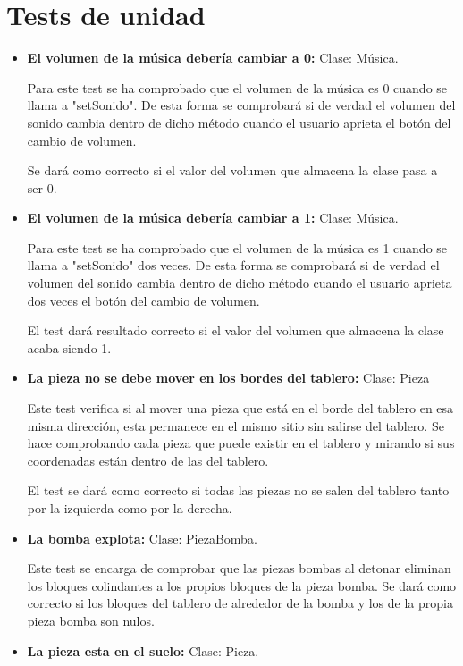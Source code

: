 \documentclass{article}
\begin{document}
\section{Tests de unidad}
\begin{itemize}
\item \textbf{El volumen de la música debería cambiar a 0:} Clase: Música.

Para este test se ha comprobado que el volumen de la música es 0 cuando se llama a "setSonido".
De esta forma se comprobará si de verdad el volumen del sonido cambia dentro de dicho método cuando el usuario aprieta el botón del cambio de volumen.

Se dará como correcto si el valor del volumen que almacena la clase pasa a ser 0.

\item \textbf{El volumen de la música debería cambiar a 1:} Clase: Música.

Para este test se ha comprobado que el volumen de la música es 1 cuando se llama a "setSonido" dos veces.
De esta forma se comprobará si de verdad el volumen del sonido cambia dentro de dicho método cuando el usuario aprieta dos veces el botón del cambio de volumen.

El test dará resultado correcto si el valor del volumen que almacena la clase acaba siendo 1.

\item \textbf{La pieza no se debe mover en los bordes del tablero:} Clase: Pieza

Este test verifica si al mover una pieza que está en el borde del tablero en esa misma dirección, esta permanece en el mismo sitio sin salirse del tablero. Se hace
comprobando cada pieza que puede existir en el tablero y mirando si sus coordenadas están dentro de las del tablero.

El test se dará como correcto si todas las piezas no se salen del tablero tanto por la izquierda como por la derecha.

\item \textbf{La bomba explota: }Clase: PiezaBomba.

Este test se encarga de comprobar que las piezas bombas al detonar eliminan los bloques colindantes a los propios bloques de la pieza bomba.
Se dará como correcto si los bloques del tablero de alrededor de la bomba y los de la propia pieza bomba son nulos.

\item \textbf{La pieza esta en el suelo:} Clase: Pieza.


\end{itemize}
\end{document}
